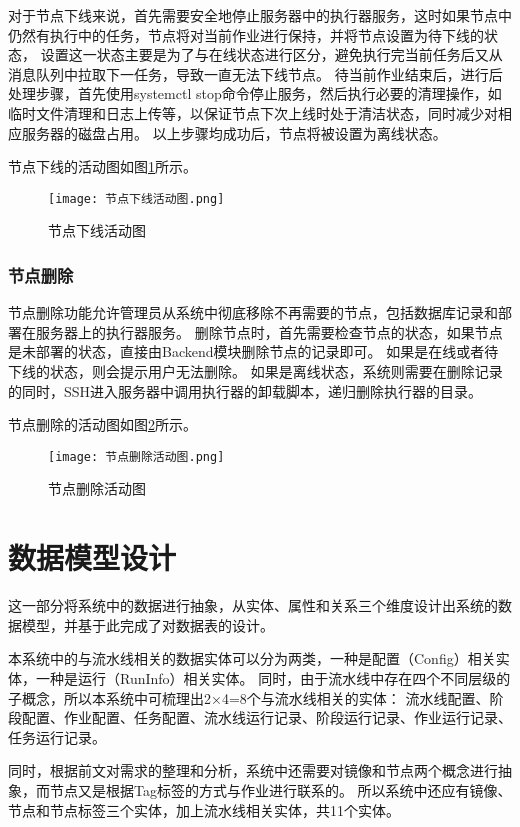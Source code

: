 对于节点下线来说，首先需要安全地停止服务器中的执行器服务，这时如果节点中仍然有执行中的任务，节点将对当前作业进行保持，并将节点设置为待下线的状态，
设置这一状态主要是为了与在线状态进行区分，避免执行完当前任务后又从消息队列中拉取下一任务，导致一直无法下线节点。
待当前作业结束后，进行后处理步骤，首先使用systemctl stop命令停止服务，然后执行必要的清理操作，如临时文件清理和日志上传等，以保证节点下次上线时处于清洁状态，同时减少对相应服务器的磁盘占用。
以上步骤均成功后，节点将被设置为离线状态。

节点下线的活动图如图\ref{fig:节点下线活动图}所示。

\begin{figure}[h]
  \centering
  \texttt{[image: 节点下线活动图.png]}
  \caption{节点下线活动图}
  \label{fig:节点下线活动图}
\end{figure}

\subsubsection{节点删除}
节点删除功能允许管理员从系统中彻底移除不再需要的节点，包括数据库记录和部署在服务器上的执行器服务。
删除节点时，首先需要检查节点的状态，如果节点是未部署的状态，直接由Backend模块删除节点的记录即可。
如果是在线或者待下线的状态，则会提示用户无法删除。
如果是离线状态，系统则需要在删除记录的同时，SSH进入服务器中调用执行器的卸载脚本，递归删除执行器的目录。

节点删除的活动图如图\ref{fig:节点删除活动图}所示。

\begin{figure}[h]
  \centering
  \texttt{[image: 节点删除活动图.png]}
  \caption{节点删除活动图}
  \label{fig:节点删除活动图}
\end{figure}

\section{数据模型设计}
这一部分将系统中的数据进行抽象，从实体、属性和关系三个维度设计出系统的数据模型，并基于此完成了对数据表的设计。

本系统中的与流水线相关的数据实体可以分为两类，一种是配置（Config）相关实体，一种是运行（RunInfo）相关实体。
同时，由于流水线中存在四个不同层级的子概念，所以本系统中可梳理出2×4=8个与流水线相关的实体：
流水线配置、阶段配置、作业配置、任务配置、流水线运行记录、阶段运行记录、作业运行记录、任务运行记录。

同时，根据前文对需求的整理和分析，系统中还需要对镜像和节点两个概念进行抽象，而节点又是根据Tag标签的方式与作业进行联系的。
所以系统中还应有镜像、节点和节点标签三个实体，加上流水线相关实体，共11个实体。

